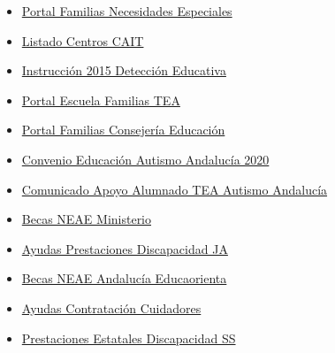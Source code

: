 \documentclass[a4paper,12pt]{article}
\begin{document}
\begin{itemize}
\item \href{https://www.familiasandalucia.es/familias-con-necesidades-especiales/}{Portal Familias Necesidades Especiales}

\item \href{https://www.juntadeandalucia.es/organismos/saludyconsumo/areas/salud-vida/adulta/paginas/ive-discapacidad.html}{Listado Centros CAIT}

\item \href{https://www.juntadeandalucia.es/organismos/desarrolloeducativoyformacionprofesional/areas/centros-educativos/atencion-diversidad.html}{Instrucción 2015 Detección Educativa}

\item \href{https://www.juntadeandalucia.es/educacion/portals/web/escuela-familias/necesidades-especificas-de-apoyo-educativo/necesidades-educativas-especiales/trastornos-del-espectro-autista}{Portal Escuela Familias TEA}

\item \href{https://www.juntadeandalucia.es/educacion/portals/web/familias}{Portal Familias Consejería Educación}

\item \href{https://www.defensordelpuebloandaluz.es/reclamamos-que-se-potencie-y-extienda-la-disponibilidad-de-aulas-especificas-de-atencion-al-alumnado}{Convenio Educación Autismo Andalucía 2020}

\item \href{https://www.autismoandalucia.org/entradas-autismo/comunicado-sobre-el-convenio-de-apoyo-al-alumnado-con-tea/}{Comunicado Apoyo Alumnado TEA Autismo Andalucía}

\item \href{https://www.educacionfpydeportes.gob.es/servicios-al-ciudadano/catalogo/general/05/050140/ficha/050140-2024.html}{Becas NEAE Ministerio}

\item \href{https://www.juntadeandalucia.es/temas/familias-igualdad/discapacidad/prestaciones.html}{Ayudas Prestaciones Discapacidad JA}

\item \href{https://educaorientamalaga.com/ayudas-y-becas-para-alumnado-con-necesidades-educativas-en-andalucia/}{Becas NEAE Andalucía Educaorienta}

\item \href{https://criando247.com/ayudas-autonomia-discapacidad/}{Ayudas Contratación Cuidadores}

\item \href{https://www.seg-social.es/wps/portal/wss/internet/Trabajadores/PrestacionesPensionesTrabajadores/61fce0cb-bb6d-4bfa-8e83-61ec6e2bce86}{Prestaciones Estatales Discapacidad SS}


\end{itemize}
\end{document}
